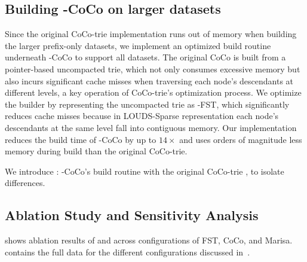 \subsection{Building \csquared-CoCo on larger datasets}\label{sec:coco-prime}

Since the original CoCo-trie implementation
runs out of memory when building the larger prefix-only datasets, we implement
an optimized build routine underneath \csquared-CoCo to support all datasets.
The original CoCo is built from a pointer-based uncompacted trie, which not only
consumes excessive memory but also incurs significant cache misses when
traversing each node's descendants at different levels, a key operation of
CoCo-trie's optimization process. We optimize the builder by representing the
uncompacted trie as \csquared-FST, which significantly reduces cache misses
because in LOUDS-Sparse representation each node's descendants at the same level
fall into contiguous memory. Our implementation reduces the build time of
\csquared-CoCo by up to $14\times$ and uses orders of magnitude less memory
during build than the original CoCo-trie.

We introduce : \csquared-CoCo's build routine with the original
CoCo-trie \bv, to isolate \bv differences. %






\subsection{Ablation Study and Sensitivity Analysis}\label{sec:ablation-study}

 shows ablation results of \bvdesign and \csquared
across configurations of FST, CoCo, and Marisa.  contains the
full data for the different \csquared configurations discussed
in~.

